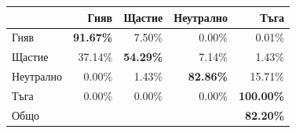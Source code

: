 \documentclass[9pt]{beamer}
\begin{document}
\begin{frame}[t]
\begin{center}
{\begin{tabular}{|l|r r r r|}
                \hline
                & Гняв & Щастие & Неутрално & Тъга \\ 
                \hline
                Гняв &  \textbf{91.67\%} & 7.50\% & 0.00\% & 0.01\% \\ 
                Щастие & 37.14\% & \textbf{54.29\%} & 7.14\% & 1.43\% \\ 
                Неутрално & 0.00\% & 1.43\% & \textbf{82.86\%} & 15.71\% \\ 
                Тъга & 0.00\% & 0.00\% & 0.00\% & \textbf{100.00\%}\\ 
                \hline
                \hline
                Общо & & & & \textbf{82.20\%}\\
                \hline
            \end{tabular}}
        \end{center}
    \end{frame}
\end{document}
